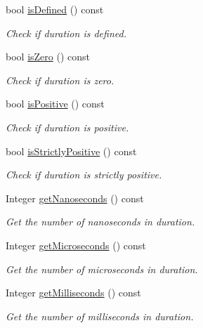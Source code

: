 \begin{DoxyCompactItemize}
bool \hyperlink{classlibrary_1_1physics_1_1time_1_1_duration_af6ee4c1644a1cafc96d670e576dc6749}{is\+Defined} () const
\begin{DoxyCompactList}\small\item\em Check if duration is defined. \end{DoxyCompactList}\item 
bool \hyperlink{classlibrary_1_1physics_1_1time_1_1_duration_a7f14980ea22f7e9cad122f7a37ba50be}{is\+Zero} () const
\begin{DoxyCompactList}\small\item\em Check if duration is zero. \end{DoxyCompactList}\item 
bool \hyperlink{classlibrary_1_1physics_1_1time_1_1_duration_a443d719fb2acf922cc80a8f2be441fa1}{is\+Positive} () const
\begin{DoxyCompactList}\small\item\em Check if duration is positive. \end{DoxyCompactList}\item 
bool \hyperlink{classlibrary_1_1physics_1_1time_1_1_duration_a2d4f7691e997232d4d9b88e7d4ab49d7}{is\+Strictly\+Positive} () const
\begin{DoxyCompactList}\small\item\em Check if duration is strictly positive. \end{DoxyCompactList}\item 
Integer \hyperlink{classlibrary_1_1physics_1_1time_1_1_duration_a5dad1e24c78cd7ef13a4220eb4e73dd0}{get\+Nanoseconds} () const
\begin{DoxyCompactList}\small\item\em Get the number of nanoseconds in duration. \end{DoxyCompactList}\item 
Integer \hyperlink{classlibrary_1_1physics_1_1time_1_1_duration_a65db73a28d87e3f06d307cbd688739a3}{get\+Microseconds} () const
\begin{DoxyCompactList}\small\item\em Get the number of microseconds in duration. \end{DoxyCompactList}\item 
Integer \hyperlink{classlibrary_1_1physics_1_1time_1_1_duration_aac5063bb791db96348e23784106a4eba}{get\+Milliseconds} () const
\begin{DoxyCompactList}\small\item\em Get the number of milliseconds in duration. \end{DoxyCompactList}\item 

\end{DoxyCompactItemize}
